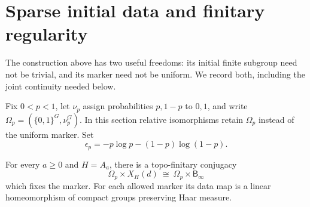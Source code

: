 \documentclass[11pt,a4paper]{article}
\numberwithin{equation}{section}
\newcommand{\Binf}{\mathsf B_\infty}
\begin{document}
\section{Sparse initial data and finitary regularity}\label{sec:sparse-finitary}

The construction above has two useful freedoms: its initial finite
subgroup need not be trivial, and its marker need not be uniform.
We record both, including the joint continuity needed below.

Fix $0<p<1$, let $\nu_p$ assign probabilities $p,1-p$ to $0,1$, and
write $\Omega_p=(\{0,1\}^G,\nu_p^G)$. In this section relative
isomorphisms retain $\Omega_p$ instead of the uniform marker.
Set
\[
 \epsilon_p=-p\log p-(1-p)\log(1-p).
\]

\begin{lemma}\label{lem:sparse-start}
For every $a\geq0$ and $H=A_a$, there is a topo-finitary conjugacy
\[
 \Omega_p\times X_H(d)\ \cong\ \Omega_p\times\Binf
\]
which fixes the marker. For each allowed marker its data map is a
linear homeomorphism of compact groups preserving Haar measure.
\end{lemma}
\end{document}
